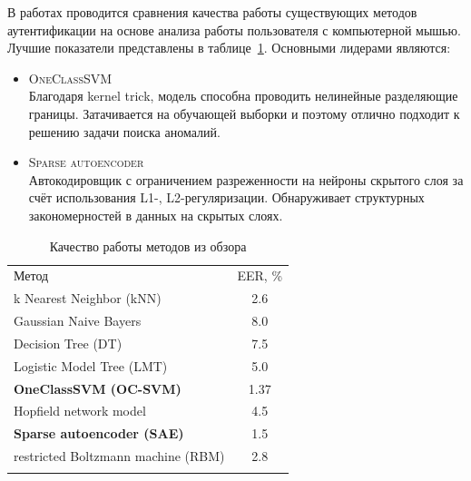 \documentclass[12pt]{article}
\begin{document}
    В работах \cite{Mondal_2, Shen} проводится сравнения качества работы существующих методов аутентификации на основе анализа работы пользователя с компьютерной мышью. Лучшие показатели представлены в таблице~\ref{sec:Overview:Model:table:Result}. Основными лидерами являются:

    \begin{itemize}
        \item \textsc{OneClassSVM} \\
        Благодаря kernel trick, модель способна проводить нелинейные разделяющие границы. Затачивается на обучающей выборки и поэтому отлично подходит к решению задачи поиска аномалий.
        \item \textsc{Sparse autoencoder} \\
        Автокодировщик с ограничением разреженности на нейроны скрытого слоя за счёт использования L1-, L2-регуляризации. Обнаруживает структурных закономерностей в данных на скрытых слоях.
    \end{itemize}

    \begin{table}[h]
        \centering
        \renewcommand{\arraystretch}{1.5}
        \renewcommand{\tabcolsep}{2mm}
        \caption{Качество работы методов из обзора}
        \begin{tabular}{ || l | c ||}
            \hhline{|t:==:t|} 
            Метод                              & EER, \% \\ [2mm]
            \hhline{|:==:|}
            k Nearest Neighbor (kNN)           & 2.6  \\ \hline
            Gaussian Naive Bayers              & 8.0  \\ \hline
            Decision Tree (DT)                 & 7.5  \\ \hline
            Logistic Model Tree (LMT)          & 5.0  \\ \hline
            \textbf{OneClassSVM (OC-SVM)}      & 1.37 \\ \hline
            Hopfield network model             & 4.5  \\ \hline
            \textbf{Sparse autoencoder (SAE)}  & 1.5  \\ \hline
            restricted Boltzmann machine (RBM) & 2.8  \\
            \hhline{|b:==:b|}
        \end{tabular}
        \label{sec:Overview:Model:table:Result}
    \end{table}
\end{document}
